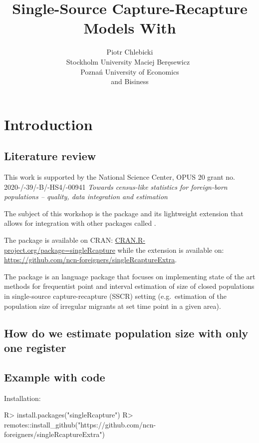 \documentclass[
]{jss}
\author{
Piotr Chlebicki\\Stockholm University \And Maciej
Beręsewicz~\orcidlink{0000-0002-8281-4301}\\Poznań University of
Economics\\
and Bisiness
}
\title{Single-Source Capture-Recapture Models With \pkg{singleRcapture}}
\newcommand{\1}{\mathmybb{1}} \newcommand{\bx}{\boldsymbol{x}}
\begin{document}
\hypertarget{introduction}{%
\section{Introduction}\label{introduction}}

\hypertarget{literature-review}{%
\subsection{Literature review}\label{literature-review}}

This work is supported by the National Science Center, OPUS 20 grant no.
2020-/-39/-B/-HS4/-00941
\textit{Towards census-like statistics for foreign-born populations -- quality, data integration and estimation}

The subject of this workshop is the  package and its
lightweight extension that allows for integration with other
 packages called .

The package is available on CRAN:
\url{CRAN.R-project.org/package=singleRcapture} while the extension is
available on:
\url{https://github.com/ncn-foreigners/singleRcaptureExtra}.

The  package is an  language package
that focuses on implementing state of the art methods for frequentist
point and interval estimation of size of closed populations in
single-source capture-recapture (SSCR) setting (e.g.~estimation of the
population size of irregular migrants at set time point in a given
area).

\hypertarget{how-do-we-estimate-population-size-with-only-one-register}{%
\subsection{How do we estimate population size with only one
register}\label{how-do-we-estimate-population-size-with-only-one-register}}

\subsection[Example with R code]{Example with 
code}\label{r-code}

Installation:

\begin{CodeChunk}
\begin{CodeInput}
R> install.packages("singleRcapture")
R> remotes::install_github("https://github.com/ncn-foreigners/singleRcaptureExtra")
\end{CodeInput}
\end{CodeChunk}
\end{document}
